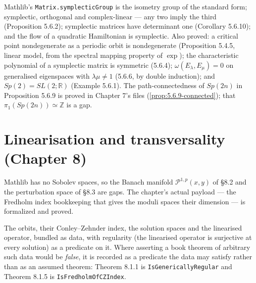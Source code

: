 \begin{proposition}
  \label{prop:5.6}
  \leanok
  Mathlib's \texttt{Matrix.symplecticGroup} is the isometry group of the standard
  form; symplectic, orthogonal and complex-linear --- any two imply the third
  (Proposition 5.6.2); symplectic matrices have determinant one (Corollary
  5.6.10); and the flow of a quadratic Hamiltonian is symplectic.  Also proved:
  a critical point nondegenerate as a periodic orbit is nondegenerate
  (Proposition 5.4.5, linear model, from the spectral mapping property of
  $\exp$); the characteristic polynomial of a symplectic matrix is symmetric
  (5.6.4); $\omega(E_\lambda, E_\mu) = 0$ on generalised eigenspaces with
  $\lambda\mu \neq 1$ (5.6.6, by double induction); and $Sp(2) = SL(2;\mathbb{R})$
  (Example 5.6.1).  The path-connectedness of
  $Sp(2n)$ in Proposition 5.6.9 is proved in Chapter 7's files
  (\ref{prop:5.6.9-connected}); that $\pi_1(Sp(2n)) \simeq \mathbb{Z}$ is a gap.
\end{proposition}

\chapter{Linearisation and transversality (Chapter 8)}

Mathlib has no Sobolev spaces, so the Banach manifold $\mathcal{P}^{1,p}(x,y)$ of
\S8.2 and the perturbation space of \S8.3 are gaps.  The chapter's actual payload
--- the Fredholm index bookkeeping that gives the moduli spaces their dimension
--- is formalized and proved.

\begin{definition}
  \label{def:8.floerdata}
  \leanok
  The orbits, their Conley--Zehnder index, the solution spaces and the linearised
  operator, bundled as data, with regularity (the linearised operator is
  surjective at every solution) as a predicate on it.  Where asserting a book
  theorem of arbitrary such data would be \emph{false}, it is recorded as a
  predicate the data may satisfy rather than as an assumed theorem: Theorem 8.1.1
  is \texttt{IsGenericallyRegular} and Theorem 8.1.5 is
  \texttt{IsFredholmOfCZIndex}.
\end{definition}

